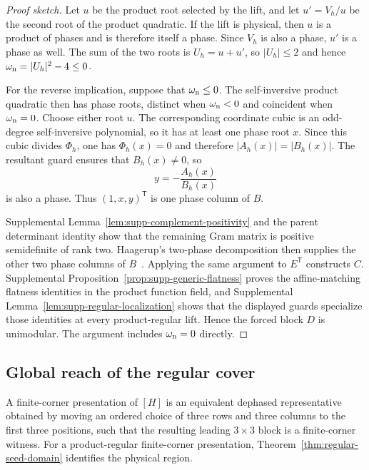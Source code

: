 \begin{proof}[Proof sketch]
Let $u$ be the product root selected by the lift, and let $u'=V_h/u$ be the second root of the product quadratic. If the lift is physical, then $u$ is a product of phases and is therefore itself a phase. Since $V_h$ is also a phase, $u'$ is a phase as well. The sum of the two roots is $U_h=u+u'$, so $|U_h|\leq2$ and hence $\omega_{\rm n}=|U_h|^2-4\leq0$.

For the reverse implication, suppose that $\omega_{\rm n}\leq0$. The self-inversive product quadratic then has phase roots, distinct when $\omega_{\rm n}<0$ and coincident when $\omega_{\rm n}=0$. Choose either root $u$. The corresponding coordinate cubic is an odd-degree self-inversive polynomial, so it has at least one phase root $x$. Since this cubic divides $\Phi_h$, one has $\Phi_h(x)=0$ and therefore $|A_h(x)|=|B_h(x)|$. The resultant guard ensures that $B_h(x)\neq0$, so
\begin{equation}
y=-\frac{A_h(x)}{B_h(x)}
\end{equation}
is also a phase. Thus $(1,x,y)^{\mathsf T}$ is one phase column of $B$.

Supplemental Lemma~\ref{lem:supp-complement-positivity} and the parent determinant identity show that the remaining Gram matrix is positive semidefinite of rank two. Haagerup's two-phase decomposition then supplies the other two phase columns of $B$~\cite{Haagerup1997,Szollosi2012FourParameter}. Applying the same argument to $E^{\mathsf T}$ constructs $C$. Supplemental Proposition~\ref{prop:supp-generic-flatness} proves the affine-matching flatness identities in the product function field, and Supplemental Lemma~\ref{lem:supp-regular-localization} shows that the displayed guards specialize those identities at every product-regular lift. Hence the forced block $D$ is unimodular. The argument includes $\omega_{\rm n}=0$ directly.
\end{proof}

\subsection{Global reach of the regular cover}
\label{subsec:global-reach-regular-cover}

A finite-corner presentation of $[H]$ is an equivalent dephased representative obtained by moving an ordered choice of three rows and three columns to the first three positions, such that the resulting leading $3\times3$ block is a finite-corner witness.
For a product-regular finite-corner presentation,
Theorem~\ref{thm:regular-seed-domain} identifies the physical region.

